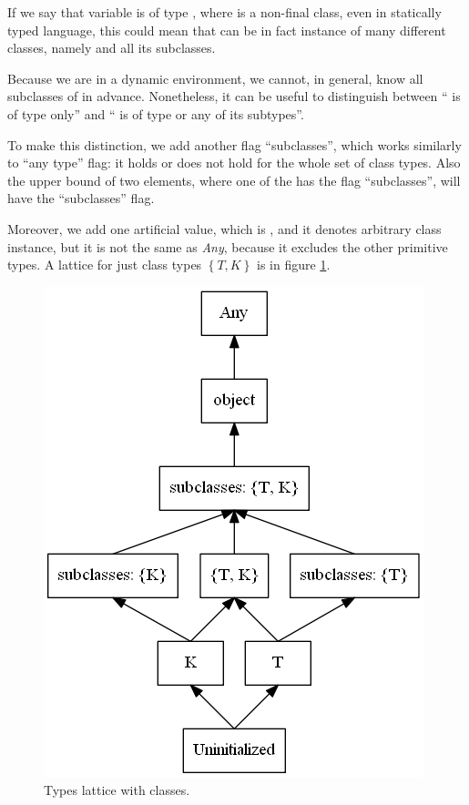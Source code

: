         If we say that variable  is of type , 
        where  is a non-final class, even in statically 
        typed language, this could mean that  can 
        be in fact instance of many different classes, 
        namely  and all its subclasses.
        
        Because we are in a dynamic environment, we cannot, 
        in general, know all subclasses of  in advance. 
        Nonetheless, it can be useful to distinguish between 
        `` is of type  only'' and 
        `` is of type  or any of its subtypes''.
        
        To make this distinction, we add another flag ``subclasses'', 
        which works similarly to ``any type'' flag: it holds or does 
        not hold for the whole set of class types. Also the upper bound 
        of two elements, where one of the has the flag ``subclasses'', 
        will have the ``subclasses'' flag.
        
        Moreover, we add one artificial value, which is , 
        and it denotes arbitrary class instance, but it is not the 
        same as \emph{Any}, because it excludes the other primitive 
        types. A lattice for just class types $\left\{T,K\right\}$ 
        is in figure \ref{objectslattice}.
        
        \begin{figure}[h]  
          \centering        
          \includegraphics[scale=0.5]{graphs/objects.png}
          \caption{Types lattice with classes.\label{objectslattice}}    
        \end{figure}        
        
